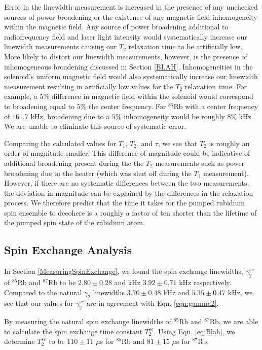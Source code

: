 Error in the linewidth measurement is increased in the presence of any unchecked sources of power broadening or the existence of any magnetic field inhomogeneity within the magnetic field.  Any source of power broadening additional to radiofrequency field and laser light intensity would systematically increase our linewidth measurements causing our $T_2$ relaxation time to be artificially low.  More likely to distort our linewidth measurements, however, is the presence of inhomogeneous broadening discussed in Section \ref{BLAH}.  Inhomogeneities in the solenoid's uniform magnetic field would also systematically increase our linewidth measurement resulting in artificially low values for the $T_2$ relaxation time.  For example, a $5\%$ difference in magnetic field within the solenoid would correspond to broadening equal to $5\%$ the center frequency.  For $^{85}$Rb with a center frequency of $161.7$ kHz, broadening due to a $5\%$ inhomogeneity would be roughly $8\%$ kHz. We are unable to eliminate this source of systematic error.

Comparing the calculated values for $T_1$, $T_2$, and $\tau$, we see that $T_2$ is roughly an order of magnitude smaller.  This difference of magnitude could be indicative of additional broadening present during the the $T_2$ measurements such as power broadening due to the heater (which was shut off during the $T_1$ measurement).  However, if there are no systematic differences between the two measurements, the deviation in magnitude can be explained by the differences in the relaxation process.  We therefore predict that the time it takes for the pumped rubidium spin ensemble to decohere is a roughly a factor of ten shorter than the lifetime of the pumped spin state of the rubidium atom. 


\subsection{Spin Exchange Analysis}\label{SpinExchangeAnalysis}

In Section \ref{MeasuringSpinExchange}, we found the spin exchange linewidths, $\gamma^{se}_2$ of $^{85}$Rb and $^{87}$Rb to be $2.80 \pm 0.28$ and kHz $3.92 \pm 0.71$ kHz respectively. Compared to the natural $\gamma_2$ linewidths $3.70 \pm 0.48$  kHz  and $5.35 \pm 0.47$ kHz, we see that our values for $\gamma^{se}_2$ are in agreement with Eqn. \ref{eqn:gamma2}.

By measuring the natural spin exchange linewidths of $^{85}$Rb and $^{87}$Rb, we are able to calculate the spin exchange time constant $T^{se}_2$.  Using Eqn. \ref{eq:Blah}, we determine $T^{se}_2$ to be $110 \pm 11$ $\mu$s for  $^{85}$Rb and $81 \pm 15$ $\mu$s for  $^{87}$Rb. 


